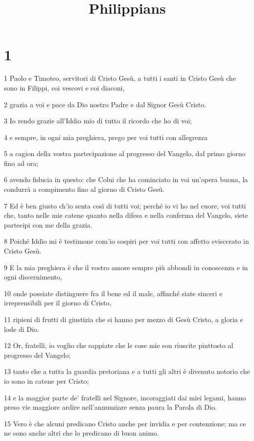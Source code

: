 

\title{Philippians}


\chapter{1}

\par 1 Paolo e Timoteo, servitori di Cristo Gesù, a tutti i santi in Cristo Gesù che sono in Filippi, coi vescovi e coi diaconi,
\par 2 grazia a voi e pace da Dio nostro Padre e dal Signor Gesù Cristo.
\par 3 Io rendo grazie all'Iddio mio di tutto il ricordo che ho di voi;
\par 4 e sempre, in ogni mia preghiera, prego per voi tutti con allegrezza
\par 5 a cagion della vostra partecipazione al progresso del Vangelo, dal primo giorno fino ad ora;
\par 6 avendo fiducia in questo: che Colui che ha cominciato in voi un'opera buona, la condurrà a compimento fino al giorno di Cristo Gesù.
\par 7 Ed è ben giusto ch'io senta così di tutti voi; perché io vi ho nel cuore, voi tutti che, tanto nelle mie catene quanto nella difesa e nella conferma del Vangelo, siete partecipi con me della grazia.
\par 8 Poiché Iddio mi è testimone com'io sospiri per voi tutti con affetto sviscerato in Cristo Gesù.
\par 9 E la mia preghiera è che il vostro amore sempre più abbondi in conoscenza e in ogni discernimento,
\par 10 onde possiate distinguere fra il bene ed il male, affinché siate sinceri e irreprensibili per il giorno di Cristo,
\par 11 ripieni di frutti di giustizia che si hanno per mezzo di Gesù Cristo, a gloria e lode di Dio.
\par 12 Or, fratelli, io voglio che sappiate che le cose mie son riuscite piuttosto al progresso del Vangelo;
\par 13 tanto che a tutta la guardia pretoriana e a tutti gli altri è divenuto notorio che io sono in catene per Cristo;
\par 14 e la maggior parte de' fratelli nel Signore, incoraggiati dai miei legami, hanno preso vie maggiore ardire nell'annunziare senza paura la Parola di Dio.
\par 15 Vero è che alcuni predicano Cristo anche per invidia e per contenzione; ma ce ne sono anche altri che lo predicano di buon animo.
